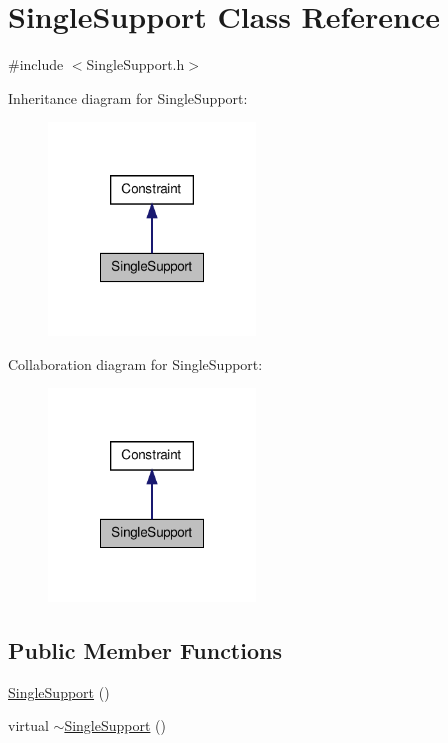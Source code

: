 \hypertarget{classSingleSupport}{\section{\-Single\-Support \-Class \-Reference}
\label{classSingleSupport}
}


{\ttfamily \#include $<$\-Single\-Support.\-h$>$}



\-Inheritance diagram for \-Single\-Support\-:\nopagebreak
\begin{figure}[H]
\begin{center}
\leavevmode
\includegraphics[width=156pt]{classSingleSupport__inherit__graph}
\end{center}
\end{figure}


\-Collaboration diagram for \-Single\-Support\-:\nopagebreak
\begin{figure}[H]
\begin{center}
\leavevmode
\includegraphics[width=156pt]{classSingleSupport__coll__graph}
\end{center}
\end{figure}
\subsection*{\-Public \-Member \-Functions}
\begin{DoxyCompactItemize}
\item 
\hyperlink{classSingleSupport_af952e77f8d2139224fc0af9b73a6a0d1}{\-Single\-Support} ()
\item 
virtual \hyperlink{classSingleSupport_a56ad004d201bf57cb3472477857b5b38}{$\sim$\-Single\-Support} ()
\end{DoxyCompactItemize}
